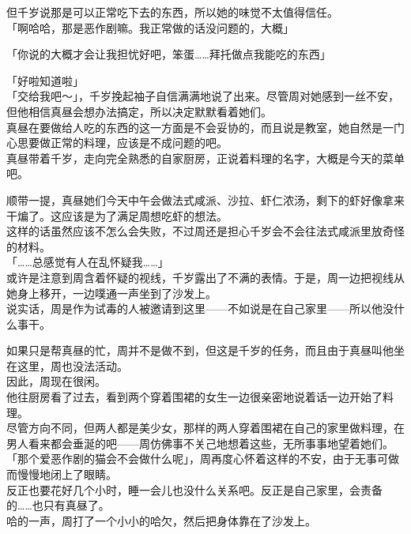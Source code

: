 但千岁说那是可以正常吃下去的东西，所以她的味觉不太值得信任。\\

「啊哈哈，那是恶作剧嘛。我正常做的话没问题的，大概」

「你说的大概才会让我担忧好吧，笨蛋……拜托做点我能吃的东西」

「好啦知道啦」\\

「交给我吧～」，千岁挽起袖子自信满满地说了出来。尽管周对她感到一丝不安，但他相信真昼会想办法搞定，所以决定默默看着她们。\\

真昼在要做给人吃的东西的这一方面是不会妥协的，而且说是教室，她自然是一门心思要做正常的料理，应该是不成问题的吧。\\

真昼带着千岁，走向完全熟悉的自家厨房，正说着料理的名字，大概是今天的菜单吧。

顺带一提，真昼她们今天中午会做法式咸派、沙拉、虾仁浓汤，剩下的虾好像拿来干煸了。这应该是为了满足周想吃虾的想法。\\

这样的话虽然应该不怎么会失败，不过周还是担心千岁会不会往法式咸派里放奇怪的材料。\\

「……总感觉有人在乱怀疑我……」\\

或许是注意到周含着怀疑的视线，千岁露出了不满的表情。于是，周一边把视线从她身上移开，一边噗通一声坐到了沙发上。\\

说实话，周是作为试毒的人被邀请到这里——不如说是在自己家里——所以他没什么事干。

如果只是帮真昼的忙，周并不是做不到，但这是千岁的任务，而且由于真昼叫他坐在这里，周也没法活动。\\

因此，周现在很闲。\\

他往厨房看了过去，看到两个穿着围裙的女生一边很亲密地说着话一边开始了料理。\\

尽管方向不同，但两人都是美少女，那样的两人穿着围裙在自己的家里做料理，在男人看来都会垂涎的吧——周仿佛事不关己地想着这些，无所事事地望着她们。\\

「那个爱恶作剧的猫会不会做什么呢」，周再度心怀着这样的不安，由于无事可做而慢慢地闭上了眼睛。\\

反正也要花好几个小时，睡一会儿也没什么关系吧。反正是自己家里，会责备的……也只有真昼了。\\

哈的一声，周打了一个小小的哈欠，然后把身体靠在了沙发上。
